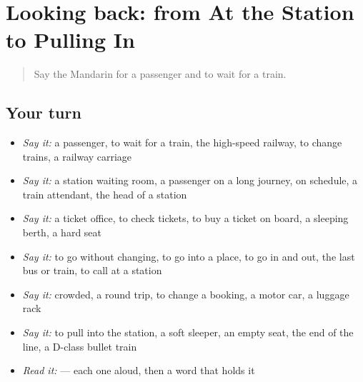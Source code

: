 \section[(dialogue)]{Looking back: from At the Station to Pulling In}

\label{lesson:ZH-R407-review-402-407}



\begin{quote}
Say the Mandarin for a passenger and to wait for a train.
\end{quote}

\subsection*{Your turn}
\begin{itemize}
\raggedright
  \item \emph{Say it:} a passenger, to wait for a train, the high-speed railway, to change trains, a railway carriage
  \item \emph{Say it:} a station waiting room, a passenger on a long journey, on schedule, a train attendant, the head of a station
  \item \emph{Say it:} a ticket office, to check tickets, to buy a ticket on board, a sleeping berth, a hard seat
  \item \emph{Say it:} to go without changing, to go into a place, to go in and out, the last bus or train, to call at a station
  \item \emph{Say it:} crowded, a round trip, to change a booking, a motor car, a luggage rack
  \item \emph{Say it:} to pull into the station, a soft sleeper, an empty seat, the end of the line, a D-class bullet train
  \item \emph{Read it:}    — each one aloud, then a word that holds it
\end{itemize}

